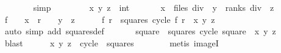 \begin{isabellebody}
\ \ \ \ \ \ \isamarkupfalse%
\ simp\isanewline
\ \ \isamarkupfalse%
\isanewline
\ \ \ \ \isamarkupfalse%
\ x\ y\ z\ {\isacharcolon}{\isacharcolon}\ int\isanewline
\ \ \ \ \isamarkupfalse%
\ {\isacharasterisk}{\isacharcolon}\ {\isachardoublequoteopen}x\ {\isasymin}\ {\isacharbraceleft}{}{\isachardot}{\isachardot}{\isacharless}files\ div\ {}{\isacharbraceright}{\isachardoublequoteclose}\ {\isachardoublequoteopen}y\ {\isasymin}\ {\isacharbraceleft}{}{\isachardot}{\isachardot}{\isacharless}ranks\ div\ {}{\isacharbraceright}{\isachardoublequoteclose}\ {\isachardoublequoteopen}z\ {\isasymin}\ {\isacharbraceleft}{}{\isachardot}{\isachardot}{\isacharless}{}{\isacharbraceright}{\isachardoublequoteclose}\isanewline
\ \ \ \ \isamarkupfalse%
\ {\isacharquery}f\ {\isacharequal}\ {\isachardoublequoteopen}{}\ {\isacharasterisk}\ x{\isachardoublequoteclose}\ \ {\isacharquery}r\ {\isacharequal}\ {\isachardoublequoteopen}{}\ {\isacharasterisk}\ y\ {\isacharplus}\ z{\isachardoublequoteclose}\isanewline
\ \ \ \ \isamarkupfalse%
\ {\isachardoublequoteopen}{\isacharparenleft}{\isacharquery}f{\isacharcomma}\ {\isacharquery}r{\isacharparenright}\ {\isasymin}\ squares{\isachardoublequoteclose}\ {\isachardoublequoteopen}cycle\ {\isacharparenleft}{\isacharquery}f{\isacharcomma}\ {\isacharquery}r{\isacharparenright}\ {\isacharequal}\ {\isacharparenleft}x{\isacharcomma}\ y{\isacharcomma}\ z{\isacharparenright}{\isachardoublequoteclose}\isanewline
\ \ \ \ \ \ \isamarkupfalse%
\ {\isacharasterisk}\isanewline
\ \ \ \ \ \ \isamarkupfalse%
\ {\isacharparenleft}auto\ simp\ add{\isacharcolon}\ squares{\isacharunderscore}def{\isacharparenright}\isanewline
\ \ \ \ \isamarkupfalse%
\ {\isachardoublequoteopen}{\isasymexists}\ square\ {\isasymin}\ squares{\isachardot}\ cycle\ square\ {\isacharequal}\ {\isacharparenleft}x{\isacharcomma}\ y{\isacharcomma}\ z{\isacharparenright}{\isachardoublequoteclose}\isanewline
\ \ \ \ \ \ \isamarkupfalse%
\ blast\isanewline
\ \ \ \ \isamarkupfalse%
\ {\isachardoublequoteopen}{\isacharparenleft}x{\isacharcomma}\ y{\isacharcomma}\ z{\isacharparenright}\ {\isasymin}\ cycle\ {\isacharbackquote}\ squares{\isachardoublequoteclose}\isanewline
\ \ \ \ \ \ \isamarkupfalse%
\ {\isacharparenleft}metis\ imageI{\isacharparenright}\isanewline
\ \ \isamarkupfalse%

\end{isabellebody}
